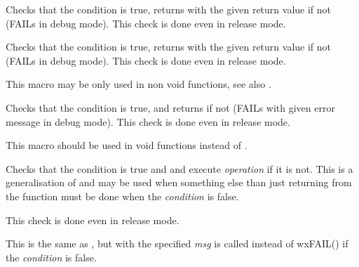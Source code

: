 


\label{wxcheck}


Checks that the condition is true, returns with the given return value if not (FAILs in debug mode).
This check is done even in release mode.


\label{wxcheckmsg}


Checks that the condition is true, returns with the given return value if not (FAILs in debug mode).
This check is done even in release mode.

This macro may be only used in non void functions, see also
.


\label{wxcheckret}


Checks that the condition is true, and returns if not (FAILs with given error
message in debug mode). This check is done even in release mode.

This macro should be used in void functions instead of
.


\label{wxcheck2}


Checks that the condition is true and  and execute
{\it operation} if it is not. This is a generalisation of
 and may be used when something else than just
returning from the function must be done when the {\it condition} is false.

This check is done even in release mode.


\label{wxcheck2msg}


This is the same as , but
 with the specified {\it msg} is called
instead of wxFAIL() if the {\it condition} is false.


\label{wxtrap}

